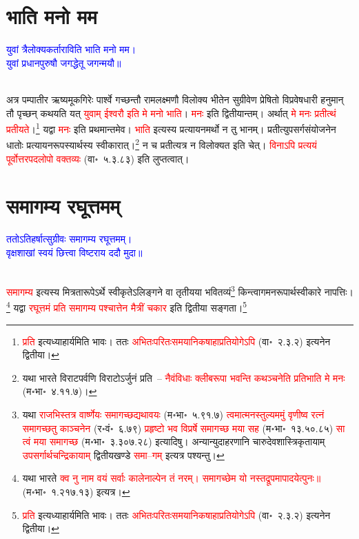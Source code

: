 \section[भाति मनो मम]{भाति मनो मम}
\centering\textcolor{blue}{युवां त्रैलोक्यकर्ताराविति भाति मनो मम।\nopagebreak\\
युवां प्रधानपुरुषौ जगद्धेतू जगन्मयौ॥}\nopagebreak\\
\\
\begin{sloppypar}\justifying\noindent\hspace{10mm} अत्र पम्पातीर ऋष्यमूक\-गिरेः पार्श्वे गच्छन्तौ राम\-लक्ष्मणौ विलोक्य भीतेन सुग्रीवेण प्रेषितो विप्र\-वेष\-धारी हनुमान् तौ पृच्छन् कथयति यत् \textcolor{red}{युवाम् ईश्वरौ इति मे मनो भाति}। \textcolor{red}{मनः} इति द्वितीयान्तम्। अर्थात् \textcolor{red}{मे मनः प्रतीत्थं प्रतीयते}।\footnote{\textcolor{red}{प्रति} इत्यध्याहार्यमिति भावः। ततः \textcolor{red}{अभितः\-परितः\-समया\-निकषा\-हा\-प्रति\-योगेऽपि} (वा॰~२.३.२) इत्यनेन द्वितीया।} यद्वा \textcolor{red}{मनः} इति प्रथमान्तमेव। \textcolor{red}{भाति} इत्यस्य प्रत्यायनमर्थो न तु भानम्। प्रतीत्युपसर्ग\-संयोजनेन धातोः प्रत्यायन\-रूपस्यार्थस्य स्वीकारात्।\footnote{यथा भारते विराट\-पर्वणि विराटोऽर्जुनं प्रति~– \textcolor{red}{नैवंविधाः क्लीबरूपा भवन्ति कथञ्चनेति प्रतिभाति मे मनः} (म॰भा॰~४.११.७)।} न च प्रतीत्यत्र न विलोक्यत इति चेत्। \textcolor{red}{विनाऽपि प्रत्ययं पूर्वोत्तर\-पद\-लोपो वक्तव्यः} (वा॰~५.३.८३) इति लुप्तत्वात्।\end{sloppypar}
\section[समागम्य रघूत्तमम्]{समागम्य रघूत्तमम्‌}
\centering\textcolor{blue}{ततोऽतिहर्षात्सुग्रीवः समागम्य रघूत्तमम्।\nopagebreak\\
वृक्षशाखां स्वयं छित्त्वा विष्टराय ददौ मुदा॥}\nopagebreak\\
\\
\begin{sloppypar}\justifying\noindent\hspace{10mm} \textcolor{red}{समागम्य} इत्यस्य मित्रता\-रूपेऽर्थे स्वीकृतेऽलिङ्गने वा तृतीयया भवितव्यं\footnote{यथा \textcolor{red}{राजभिस्तत्र वार्ष्णेयः समागच्छद्यथावयः} (म॰भा॰~५.९१.७) \textcolor{red}{त्वमात्मनस्तुल्यममुं वृणीष्व रत्नं समागच्छतु काञ्चनेन} (र॰वं॰~६.७९) \textcolor{red}{प्रहृष्टो भव विप्रर्षे समागच्छ मया सह} (म॰भा॰~१३.५०.८५) \textcolor{red}{सा त्वं मया समागच्छ} (म॰भा॰~३.३०७.२८) इत्यादिषु। अन्यान्युदाहरणानि चारुदेव\-शास्त्रि\-कृतायाम् \textcolor{red}{उपसर्गार्थ\-चन्द्रिकायाम्} द्वितीय\-खण्डे \textcolor{red}{समा–गम्} इत्यत्र पश्यन्तु।} किन्त्वागमन\-रूपार्थ\-स्वीकारे नापत्तिः।\footnote{यथा भारते \textcolor{red}{क्व नु नाम वयं सर्वाः कालेनाल्पेन तं नरम्। समागच्छेम यो नस्तद्रूपमापादयेत्पुनः॥} (म॰भा॰~१.२१७.१३) इत्यत्र।} यद्वा \textcolor{red}{रघूत्तमं प्रति समागम्य पश्चात्तेन मैत्रीं चकार} इति द्वितीया सङ्गता।\footnote{\textcolor{red}{प्रति} इत्यध्याहार्यमिति भावः। ततः \textcolor{red}{अभितः\-परितः\-समया\-निकषा\-हा\-प्रति\-योगेऽपि} (वा॰~२.३.२) इत्यनेन द्वितीया।}\end{sloppypar}
